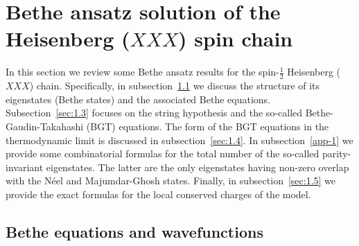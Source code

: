 \documentclass[11pt]{iopart}
\begin{document}
%
%


%
%

\section{Bethe ansatz solution of the Heisenberg ($XXX$) spin chain}
\label{sec:1}

In this section we review some Bethe ansatz results for the spin-$\frac{1}{2}$ Heisenberg 
($XXX$) chain. Specifically, in subsection~\ref{sec:1.2} we discuss the structure of  
its eigenstates (Bethe states) and the associated Bethe equations. 
Subsection~\ref{sec:1.3} focuses on the string hypothesis 
and the so-called Bethe-Gaudin-Takahashi (BGT) equations. 
The form of the BGT equations in the thermodynamic limit is discussed in subsection~\ref{sec:1.4}. 
In subsection~\ref{app-1} we provide some combinatorial formulas for the total 
number of the so-called parity-invariant eigenstates. The latter are the only eigenstates 
having non-zero overlap with the N\'eel and Majumdar-Ghosh states. 
Finally, in subsection~\ref{sec:1.5} we provide the exact formulas for the 
local conserved charges of the model. 





\subsection{Bethe equations and wavefunctions}
\label{sec:1.2}
\end{document}
